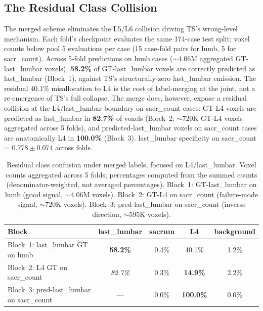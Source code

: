 \documentclass{article}
\newcommand{\sota}{TS}
\begin{document}
\subsection{The Residual Class Collision}
\label{sec:residual}

The merged scheme eliminates the L5/L6 collision driving
\sota{}'s wrong-level mechanism. Each fold's checkpoint
evaluates the same 174-case test split; voxel counts
below pool 5 evaluations per case (15 case-fold pairs for
lumb, 5 for sacr\_count). Across 5-fold predictions on
lumb cases (${\sim}4.06$M aggregated GT-last\_lumbar
voxels), \textbf{58.2\%} of GT-last\_lumbar voxels are
correctly predicted as last\_lumbar (Block~1), against
\sota{}'s structurally-zero last\_lumbar emission. The
residual $40.1\%$ misallocation to L4 is the cost of
label-merging at the joint, not a re-emergence of
\sota{}'s full collapse. The merge does, however, expose
a residual collision at the L4/last\_lumbar boundary on
sacr\_count cases: GT-L4 voxels are predicted as
last\_lumbar in \textbf{82.7\%} of voxels (Block~2;
${\sim}720$K GT-L4 voxels aggregated across 5 folds),
and predicted-last\_lumbar voxels on sacr\_count cases
are anatomically L4 in \textbf{100.0\%} (Block~3).
last\_lumbar specificity on sacr\_count = $0.778 \pm
0.074$ across folds.

\begin{table}[t]
\caption{Residual class confusion under merged labels,
focused on L4/last\_lumbar. Voxel counts aggregated
across 5 folds; percentages computed from the summed
counts (denominator-weighted, not averaged percentages).
Block~1: GT-last\_lumbar on lumb (good signal,
${\sim}4.06$M voxels). Block~2: GT-L4 on sacr\_count
(failure-mode signal, ${\sim}720$K voxels). Block~3:
pred-last\_lumbar on sacr\_count (inverse direction,
${\sim}595$K voxels).}
\label{tab:confusion_blocks}
\centering
\small
\begin{tabular}{lcccc}
\toprule
\bfseries Block & last\_lumbar & sacrum & L4 & background \\
\midrule
Block~1: last\_lumbar GT on lumb           & \textbf{58.2\%} & 0.4\%  & 40.1\%  & 1.2\% \\
Block~2: L4 GT on sacr\_count              & \emph{82.7\%}   & 0.3\%  & \textbf{14.9\%} & 2.2\% \\
Block~3: pred-last\_lumbar on sacr\_count  & ---             & 0.0\%  & \textbf{100.0\%} & 0.0\% \\
\bottomrule
\end{tabular}
\end{table}
\end{document}
